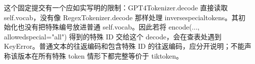 \documentclass[11pt,a4paper]{article}
\newlength{\BpeDocTableWidth}
\newcommand{\BpeDocCodeInline}[1]{{\ttfamily #1}}
\begin{document}
\begin{minipage}{\linewidth}
\begin{tabular}{>{\raggedleft\arraybackslash}p{0.065\BpeDocTableWidth}>{\raggedright\arraybackslash}p{0.475\BpeDocTableWidth}>{\raggedright\arraybackslash}p{0.460\BpeDocTableWidth}}
\bottomrule
\end{tabular}
\end{minipage}\par\addvspace{0.65em}
\endgroup


这个固定提交有一个应如实写明的限制：\BpeDocCodeInline{GPT4Tokenizer.\allowbreak{}decode} 直接读取 \BpeDocCodeInline{self.\allowbreak{}vocab}，没有像 \BpeDocCodeInline{RegexTokenizer.\allowbreak{}decode} 那样处理 \BpeDocCodeInline{inverse\relax\allowbreak{}special\char95\relax\allowbreak{}tokens}。其初始化也没有把特殊编号放进普通 \BpeDocCodeInline{self.\allowbreak{}vocab}。因此若将 \BpeDocCodeInline{encode}(..., \BpeDocCodeInline{allowed\relax\allowbreak{}special}="\BpeDocCodeInline{all}") 得到的特殊 ID 交给这个 \BpeDocCodeInline{decode}，会在查表处遇到 \BpeDocCodeInline{KeyError}。普通文本的往返编码和包含特殊 ID 的往返编码，应分开说明；不能声称该版本在所有特殊 \BpeDocCodeInline{token} 情形下都完整等价于 tiktoken。
\end{document}

